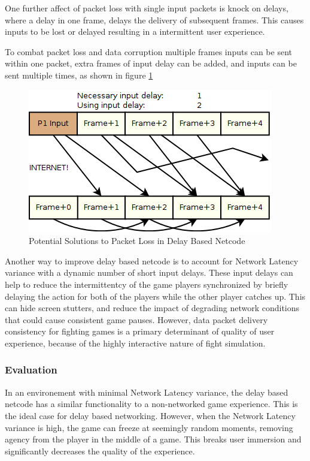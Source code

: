 \documentclass{entcs}
\begin{document}
One further affect of packet loss with single input packets is knock on delays, where a delay in one frame, delays the delivery of subsequent frames. This causes inputs to be lost or delayed resulting in a intermittent user experience.

To combat packet loss and data corruption multiple frames inputs can be sent within one packet, extra frames of input delay can be added, and inputs can be sent multiple times, as shown in figure \ref{fig:PacketLossSoultions}

\begin{figure}[H]
\centering
\includegraphics{PacketLossSoultions}
\caption{Potential Solutions to Packet Loss in Delay Based Netcode \cite{FightingGameNetworking}}
\label{fig:PacketLossSoultions}
\end{figure}

Another way to improve delay based netcode is to account for Network Latency variance with a dynamic number of short input delays. These input delays can help to reduce the intermittentcy of the game players synchronized by briefly delaying the action for both of the players while the other player catches up\cite{DelayVsRollback}. This can hide screen stutters, and reduce the impact of degrading network conditions that could cause consistent game pauses. However, data packet delivery consistency for fighting games is a primary determinant of quality of user experience\cite{Core-ARollback}, because of the highly interactive nature of fight simulation.

\subsubsection{Evaluation}
In an environement with minimal Network Latency variance, the delay based netcode has a similar functionality to a non-networked game experience. This is the ideal case for delay based networking. However, when the Network Latency variance is high, the game can freeze at seemingly random moments, removing agency from the player in the middle of a game. This breaks user immersion and significantly decreases the quality of the experience\cite{DelayVsRollback}\cite{KIInterview}.
\end{document}
